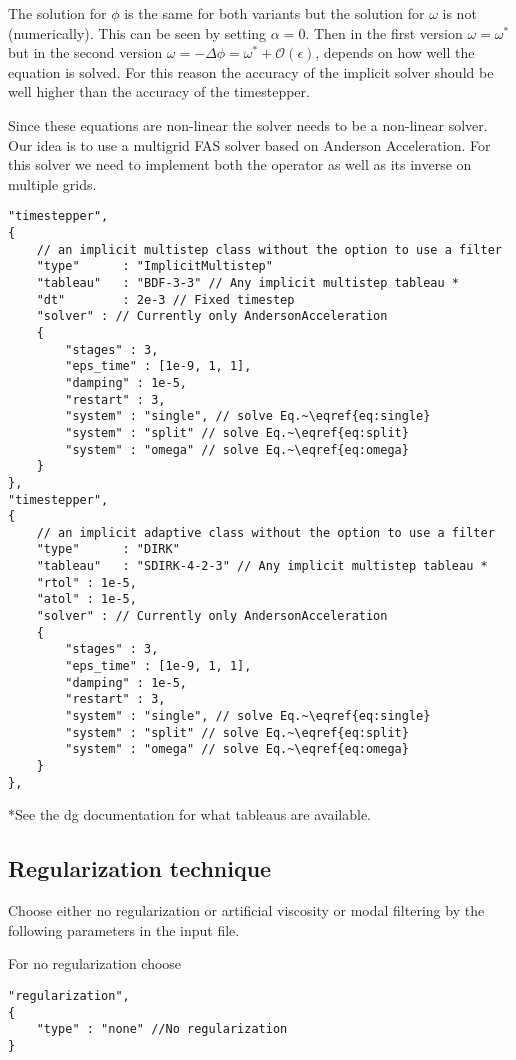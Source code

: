 The solution for $\phi$ is the same for both variants but the solution for
$\omega$ is not (numerically). This can be seen by setting $\alpha=0$. Then in
the first version $\omega=\omega^*$ but in the second version
$\omega=-\Delta\phi = \omega^* + \mathcal O(\epsilon)$, depends on how well the
equation is solved. For this reason the accuracy of the implicit solver should
be well higher than the accuracy of the timestepper.

Since these equations are non-linear the solver needs to be a non-linear solver. Our idea is to use a multigrid FAS solver based on Anderson Acceleration. For this solver we need to implement both the operator as well as its inverse on multiple grids.
\begin{verbatim}
"timestepper",
{
    // an implicit multistep class without the option to use a filter
    "type"      : "ImplicitMultistep"
    "tableau"   : "BDF-3-3" // Any implicit multistep tableau *
    "dt"        : 2e-3 // Fixed timestep
    "solver" : // Currently only AndersonAcceleration
    {
        "stages" : 3,
        "eps_time" : [1e-9, 1, 1],
        "damping" : 1e-5,
        "restart" : 3,
        "system" : "single", // solve Eq.~\eqref{eq:single}
        "system" : "split" // solve Eq.~\eqref{eq:split}
        "system" : "omega" // solve Eq.~\eqref{eq:omega}
    }
},
"timestepper",
{
    // an implicit adaptive class without the option to use a filter
    "type"      : "DIRK"
    "tableau"   : "SDIRK-4-2-3" // Any implicit multistep tableau *
    "rtol" : 1e-5,
    "atol" : 1e-5,
    "solver" : // Currently only AndersonAcceleration
    {
        "stages" : 3,
        "eps_time" : [1e-9, 1, 1],
        "damping" : 1e-5,
        "restart" : 3,
        "system" : "single", // solve Eq.~\eqref{eq:single}
        "system" : "split" // solve Eq.~\eqref{eq:split}
        "system" : "omega" // solve Eq.~\eqref{eq:omega}
    }
},
\end{verbatim}
*See the dg documentation for what tableaus are available.
\subsection{Regularization technique}
Choose either no regularization or artificial viscosity or modal filtering by the following
parameters in the input file.

For no regularization choose
\begin{verbatim}
"regularization",
{
    "type" : "none" //No regularization
}
\end{verbatim}

